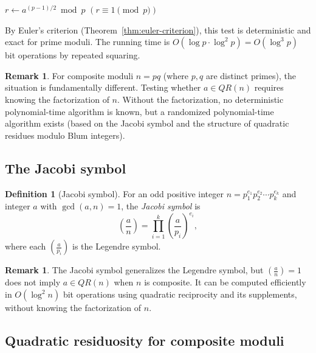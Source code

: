 \documentclass[twoside,12pt]{book}
\theoremstyle{plain}
\theoremstyle{definition}
\newtheorem{definition}[theorem]{Definition}
\newtheorem{remark}[theorem]{Remark}
\theoremstyle{remark}
\begin{document}
\begin{algorithm}
\caption{Randomized Quadratic Residue Test (modulo prime $p$)}
\label{alg:qr-test}
\begin{algorithmic}[1]
 
    \State $r \gets a^{(p-1)/2} \bmod p$ 
    \State \Return $(r \equiv 1 \pmod{p})$
\EndFunction
\end{algorithmic}
\end{algorithm}

By Euler's criterion (Theorem~\ref{thm:euler-criterion}), this test is deterministic and exact for prime moduli. The running time is $O(\log p \cdot \log^2 p) = O(\log^3 p)$ bit operations by repeated squaring.

\begin{remark}
For composite moduli $n = pq$ (where $p, q$ are distinct primes), the situation is fundamentally different. Testing whether $a \in QR(n)$ requires knowing the factorization of $n$. Without the factorization, no deterministic polynomial-time algorithm is known, but a randomized polynomial-time algorithm exists (based on the Jacobi symbol and the structure of quadratic residues modulo Blum integers).
\end{remark}

\subsection{The Jacobi symbol}

\begin{definition}[Jacobi symbol]
For an odd positive integer $n = p_1^{e_1} p_2^{e_2} \cdots p_k^{e_k}$ and integer $a$ with $\gcd(a, n) = 1$, the \emph{Jacobi symbol} is
\[
\left(\frac{a}{n}\right) = \prod_{i=1}^{k} \left(\frac{a}{p_i}\right)^{e_i},
\]
where each $\left(\frac{a}{p_i}\right)$ is the Legendre symbol.
\end{definition}

\begin{remark}
The Jacobi symbol generalizes the Legendre symbol, but $\left(\frac{a}{n}\right) = 1$ does not imply $a \in QR(n)$ when $n$ is composite. It can be computed efficiently in $O(\log^2 n)$ bit operations using quadratic reciprocity and its supplements, without knowing the factorization of $n$.
\end{remark}

\subsection{Quadratic residuosity for composite moduli}
\end{document}
